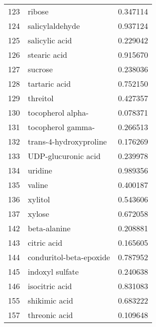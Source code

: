 \begin{tabular}{llr}
123 &                             ribose &  0.347114 \\
124 &                    salicylaldehyde &  0.937124 \\
125 &                     salicylic acid &  0.229042 \\
126 &                       stearic acid &  0.915670 \\
127 &                            sucrose &  0.238036 \\
128 &                      tartaric acid &  0.752150 \\
129 &                           threitol &  0.427357 \\
130 &                  tocopherol alpha- &  0.078371 \\
131 &                  tocopherol gamma- &  0.266513 \\
132 &             trans-4-hydroxyproline &  0.176269 \\
133 &                UDP-glucuronic acid &  0.239978 \\
134 &                            uridine &  0.989356 \\
135 &                             valine &  0.400187 \\
136 &                            xylitol &  0.543606 \\
137 &                             xylose &  0.672058 \\
142 &                       beta-alanine &  0.208881 \\
143 &                        citric acid &  0.165605 \\
144 &            conduritol-beta-epoxide &  0.787952 \\
145 &                    indoxyl sulfate &  0.240638 \\
146 &                     isocitric acid &  0.831083 \\
155 &                      shikimic acid &  0.683222 \\
157 &                      threonic acid &  0.109648 \\
\bottomrule
\end{tabular}
